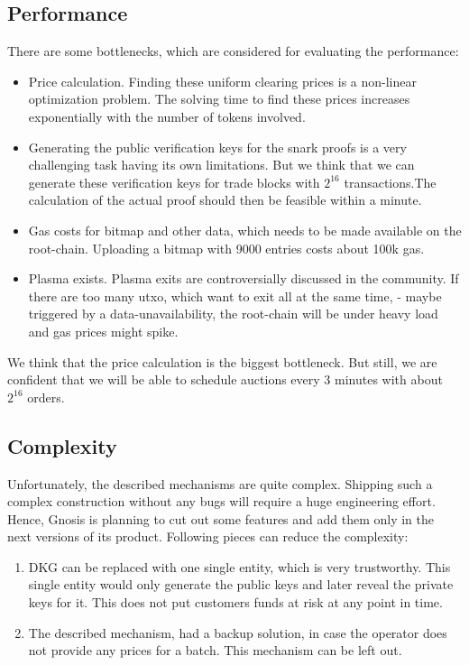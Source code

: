 \documentclass[11pt,parskip=full]{scrartcl}%
\begin{document}
\subsection{Performance}
There are some bottlenecks, which are considered for evaluating the performance:
\begin{itemize}
  \item Price calculation. Finding these uniform clearing prices is a non-linear optimization problem. The solving time to find these prices increases exponentially with the number of tokens involved. 
\item Generating the public verification keys for the snark proofs is a very challenging task having its own limitations. But we think that we can generate these verification keys for trade blocks with $2^{16}$ transactions.The calculation of the actual proof should then be feasible within a minute.
\item Gas costs for bitmap and other data, which needs to be made available on the root-chain. Uploading a bitmap with 9000 entries costs about 100k gas.
\item Plasma exists. Plasma exits are controversially discussed in the community. If there are too many utxo, which want to exit all at the same time, - maybe triggered by a data-unavailability, the root-chain will be under heavy load and gas prices might spike.
\end{itemize}
We think that the price calculation is the biggest bottleneck. But still, we are confident that we will be able to schedule auctions every 3 minutes with about $2^{16}$ orders.
\subsection{Complexity}
Unfortunately, the described mechanisms are quite complex. Shipping such a complex construction without any bugs will require a huge engineering effort. Hence, Gnosis is planning to cut out some features and add them only in the next versions of its product.\newline
Following pieces can reduce the complexity:\begin{enumerate}
\item DKG can be replaced with one single entity, which is very trustworthy. This single entity would only generate the public keys and later reveal the private keys for it. This does not put customers funds at risk at any point in time.
\item The described mechanism, had a backup solution, in case the operator does not provide any prices for a batch. This mechanism can be left out.
\end{enumerate}
\end{document}

